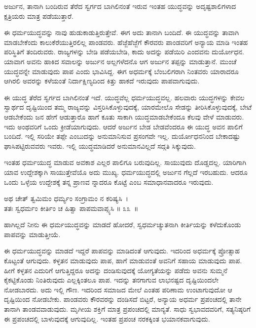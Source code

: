 \begin{artha}
ಅರ್ಜುನ, ತಾನಾಗಿ ಬಂದಿರುವ ತೆರೆದ ಸ್ವರ್ಗದ ಬಾಗಿಲಿನಂತೆ ಇರುವ ಇಂತಹ ಯುದ್ಧವನ್ನು ಅದೃಷ್ಟಶಾಲಿಗಳಾದ ಕ್ಷತ್ರಿಯರು ಮಾತ್ರ ಪಡೆಯುತ್ತಾರೆ.
\end{artha}

ಈ ಧರ್ಮಯುದ್ಧವನ್ನು ನಾವು ಹುಡುಕಾಡುತ್ತಿರುತ್ತೇವೆ. ಈಗ ಅದು ತಾನಾಗಿ ಬಂದಿದೆ. ಈ ಯುದ್ಧವನ್ನು ತಾವಾಗಿ ಮಾಡಬೇಕೆಂದು ಕಾಲುಕೆರೆಯುತ್ತಿರಲಿಲ್ಲ ಪಾಂಡವರು. ಹೆಜ್ಜೆಹೆಜ್ಜೆಗೆ ಕೌರವರು ಪಾಂಡವರಿಗೆ ಅನ್ಯಾಯ ಮಾಡಿ ಇಂತಹ ಪರಿಸ್ಥಿತಿಗೆ ತಂದಿರುವರು. ರಾಜ್ಯಗಳನ್ನು ಬೇಡಿ ಪಡೆಯಬೇಡಿ, ಕಾದು ಅದನ್ನು ಪಡೆಯಿರಿ ಎಂದವನು ದುರ್ಯೋಧನ. ಯಾವಾಗ ಅವನು ಹಾಕಿದ ಸವಾಲನ್ನು ಅರ್ಜುನ ಅಲ್ಲಗಳೆದನೊ ಆಗ ಅರ್ಜುನ ತಪ್ಪನ್ನು ಮಾಡುತ್ತಾನೆ. ಮುಂಚೆ ಯುದ್ಧವನ್ನೇ ಮಾಡುವುದು ಪಾಪ ಎಂದು ಭಾವಿಸಿದ್ದ. ಈಗ ಅಧರ್ಮಕ್ಕೆ ಬೆಂಬಲಿಗರಾಗಿ ನಿಂತವರು ಯಾರಾದರೂ ಆಗಿರಲಿ ಅವರನ್ನು ಕಳೆಯಂತೆ ನಿರ್ದಾಕ್ಷಿಣ್ಯದಿಂದ ಕಿತ್ತು ಹಾಕದೆ ಇರುವುದು ಪಾಪವಾಗುವುದು.

ಈ ಯುದ್ಧ ತೆರೆದ ಸ್ವರ್ಗದ ಬಾಗಿಲಿನಂತೆ ಇದೆ. ಯುದ್ಧವೆಲ್ಲ ಧರ್ಮಯುದ್ಧವಲ್ಲ. ಹಲವಾರು ಯುದ್ಧಗಳನ್ನು ಕೇವಲ ಸ್ವಾರ್ಥದ ದೃಷ್ಟಿಯಿಂದ ತಮ್ಮ ರಾಜ್ಯವನ್ನು ವಿಸ್ತರಿಸಿಕೊಳ್ಳುವುದಕ್ಕೆ, ಯಾರಮೇಲೊ ಸೇಡನ್ನು ತೀರಿಸಿಕೊಳ್ಳುವುದಕ್ಕೆ, ಬೇಟೆ ಆಡಬೇಕೆಂದು ಜನ ಹೇಗೆ ಆಡುತ್ತಾರೊ ಹಾಗೆ ಕೂತು ಸಾಕಾಗಿ ಯುದ್ಧಮಾಡಬೇಕೆಂದೂ ಕೆಲವು ವೇಳೆ ಮಾಡುವರು. ಇದು ಅಂಥವರಿಗೆ ಒಂದು ಕ್ರೀಡೆಯಾಗುವುದು. ಆದರೆ ಅರ್ಜುನ ಬೇಡ ಬೇಡವೆಂದರೂ ಈ ಯುದ್ಧ ಅವನ ಪಾಲಿಗೆ ಬಂದಿದೆ. ಇಲ್ಲಿ ಸರಿಯೇ ತಪ್ಪೇ ಎಂಬುದನ್ನು ಅನುಮಾನಿಸುವ ಪ್ರಸಂಗವೇ ಇಲ್ಲ. ದುರ್ಯೋಧನನಿಂದ ಬೇಕಾದಷ್ಟು ಘಾಸಿಪಟ್ಟಿರುವವರು ಇವರು. ಇಲ್ಲಿ ಯುದ್ಧಮಾಡಿದರೆ ಅನುಮಾನವಿಲ್ಲದೆ ಸದ್ಗತಿ ಸಿಕ್ಕುವುದು.

ಇಂತಹ ಧರ್ಮಯುದ್ಧ ಮಾಡುವ ಅವಕಾಶ ಎಲ್ಲರ ಪಾಲಿಗೂ ಬರುವುದಿಲ್ಲ. ಸಾಯುವುದು ದೊಡ್ಡದಲ್ಲ. ಯಾರಿಗಾಗಿ ಯಾವ ಉದ್ದೇಶಕ್ಕಾಗಿ ಸಾಯುತ್ತೇವೆಯೊ ಅದು ಮುಖ್ಯ. ಧರ್ಮಯುದ್ಧದಲ್ಲಿ ಅರ್ಜುನ ಗೆಲ್ಲದೆ ಇರಬಹುದು. ಆದರೂ ಒಂದು ಒಳ್ಳೆಯ ಉದ್ದೇಶಕ್ಕೆ ತನ್ನ ಪ್ರಾಣವ ನ್ನಾದರೂ ಕೊಟ್ಟೆ ಎಂಬ ಸಮಾಧಾನವಾದರೂ ಇರುವುದು.

\begin{shloka}
ಅಥ ಚೇತ್ ತ್ವಮಿಮಂ ಧರ್ಮ್ಯಂ ಸಂಗ್ರಾಮಂ ನ ಕರಿಷ್ಯಸಿ~।\\ತತಃ ಸ್ವಧರ್ಮಂ ಕೀರ್ತಿಂ ಚ ಹಿತ್ವಾ ಪಾಪಮವಾಪ್ಸ್ಯಸಿ \hfill॥ ೩೩~॥
\end{shloka}

\begin{artha}
ಹಾಗಿಲ್ಲದೆ ನೀನು ಈ ಧರ್ಮಯುದ್ಧವನ್ನು ಮಾಡದೆ ಹೋದರೆ, ಸ್ವಧರ್ಮಚ್ಯುತನಾಗಿ ಕೀರ್ತಿಯನ್ನು ಕಳೆದುಕೊಂಡು ಪಾಪವನ್ನು ಮಾಡುತ್ತೀಯೆ.
\end{artha}

ಈ ಧರ್ಮಯುದ್ಧವನ್ನು ಮಾಡದೆ ಇದ್ದರೆ ಪಾಪವನ್ನು ಮಾಡಿದಂತೆ ಆಗುವುದು. ಇದರಿಂದ ಅಧರ್ಮಕ್ಕೆ ಪ್ರೋತ್ಸಾಹ ಕೊಟ್ಟಂತೆ ಆಗುವುದು. ಕಳ್ಳತನ ಮಾಡುವುದು ಪಾಪ, ಹಾಗೆ ಮಾಡುವಂತೆ ಅವನಿಗೆ ಸಹಾಯ ಮಾಡುವುದು ಪಾಪ. ಹೀಗೆ ಕಳ್ಳತನ ಎದುರಿಗೆ ಆಗುತ್ತಿದ್ದರೂ ಅದನ್ನು ದಂಡಿಸುವುದಕ್ಕೆ ಯೋಗ್ಯತೆಯನ್ನು ಪಡೆದು ಅವನು ಸುಮ್ಮನೆ ಕೈಕಟ್ಟಿಕೊಂಡು ನಿಂತಿರುವುದು ಎಲ್ಲಕ್ಕಿಂತಲೂ ಪಾಪ. ಇದನ್ನು ತನಗಾಗುವ ಲಾಭನಷ್ಟದ ದೃಷ್ಟಿಯಿಂದಲೇ ನೋಡಬಾರದು. ಅದು ಇಲ್ಲಿ ಗೌಣ. ಇದರಿಂದ ಸಮಾಜದ ಮೇಲೆ ಎಂತಹ ಪರಿಣಾಮ ಉಂಟಾಗುವುದೋ ಆ ದೃಷ್ಟಿಯಿಂದ ನೋಡಬೇಕು. ಪಾಂಡವರು ಕೌರವರನ್ನು ದಂಡಿಸದೆ ಬಿಟ್ಟರೆ, ಅನ್ಯಾಯ ಅಧರ್ಮ ಪ್ರಪಂಚದಲ್ಲಿ ತಾನೇ ತಾನಾಗಿ ತಾಂಡವವಾಡುವುದು. ಮೃಗೀಯ ಶಕ್ತಿಗೆ ಮಾತ್ರ ಪ್ರಪಂಚದಲ್ಲಿ ಮಾನ್ಯತೆ. ಸಾಧು ಸ್ವಭಾವದವರಿಗೆ, ಸತ್ಯನಿಷ್ಠರಿಗೆ ಈ ಪ್ರಪಂಚದಲ್ಲಿ ಬಾಳುವುದಕ್ಕೆ ಆಗುವುದಿಲ್ಲ. ಇಂತಹ ಪ್ರಪಂಚ ನರಕಕ್ಕಿಂತ ಭಯಾನಕವಾಗುವುದು.

